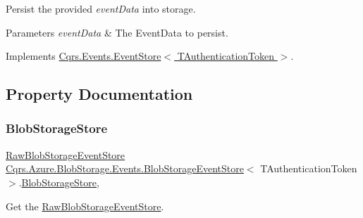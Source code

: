 Persist the provided {\itshape event\+Data}  into storage. 


\begin{DoxyParams}{Parameters}
{\em event\+Data} & The Event\+Data to persist.\\
\hline
\end{DoxyParams}


Implements \hyperlink{classCqrs_1_1Events_1_1EventStore_aedb71ca0ddf21220e323bc60ad7508cd_aedb71ca0ddf21220e323bc60ad7508cd}{Cqrs.\+Events.\+Event\+Store$<$ T\+Authentication\+Token $>$}.



\subsection{Property Documentation}
\mbox{\label{classCqrs_1_1Azure_1_1BlobStorage_1_1Events_1_1BlobStorageEventStore_a85b9d71c130e5748886a61d80447116d_a85b9d71c130e5748886a61d80447116d}} 
\subsubsection{\texorpdfstring{Blob\+Storage\+Store}{BlobStorageStore}}
{\footnotesize\ttfamily \hyperlink{classCqrs_1_1Azure_1_1BlobStorage_1_1Events_1_1BlobStorageEventStore_1_1RawBlobStorageEventStore}{Raw\+Blob\+Storage\+Event\+Store} \hyperlink{classCqrs_1_1Azure_1_1BlobStorage_1_1Events_1_1BlobStorageEventStore}{Cqrs.\+Azure.\+Blob\+Storage.\+Events.\+Blob\+Storage\+Event\+Store}$<$ T\+Authentication\+Token $>$.\hyperlink{classCqrs_1_1Azure_1_1BlobStorage_1_1BlobStorageStore}{Blob\+Storage\+Store}\hspace{0.3cm}{\ttfamily [get]}, {\ttfamily [protected]}}



Get the \hyperlink{classCqrs_1_1Azure_1_1BlobStorage_1_1Events_1_1BlobStorageEventStore_1_1RawBlobStorageEventStore}{Raw\+Blob\+Storage\+Event\+Store}. 

